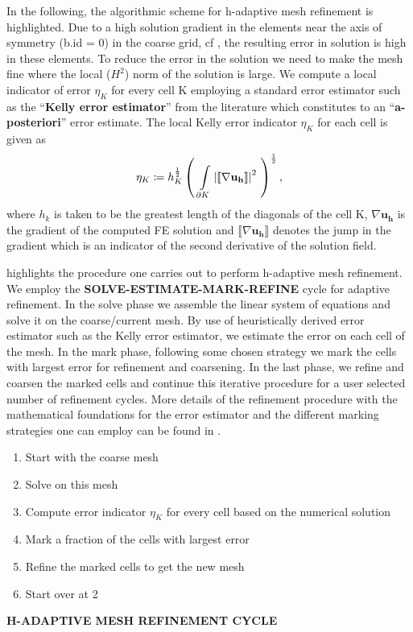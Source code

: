 In the following, the algorithmic scheme for h-adaptive mesh refinement is highlighted. Due to a high solution gradient in the elements near the axis of symmetry (b.id = 0) in the coarse grid, cf , the resulting error in solution is high in these elements. To reduce the error in the solution we need to make the mesh fine where the local ($H^2$) norm of the solution is large. We compute a local indicator of error $\eta_K$ for every cell K employing a standard error estimator such as the ``\textbf{Kelly error estimator}'' from the literature \cite{Kelly1983} which constitutes to an ``\textbf{a-posteriori}'' error estimate. The local Kelly error indicator $\eta_K$ for each cell is given as 
\begin{equation}
\eta_K \coloneqq h_K^{\frac{1}{2}} \left( \ \int\limits_{\partial K} \seminorm{{\llbracket\nabla \mathbf{u_h} \rrbracket}}^2 \ \right)^{\frac{1}{2}},
\label{eq:2.27}
\end{equation}
where $h_k$ is taken to be the greatest length of the diagonals of the cell K, $\nabla \mathbf{u_h}$ is the gradient of the computed FE solution and $\llbracket\nabla \mathbf{u_h} \rrbracket$ denotes the jump in the gradient which is an indicator of the second derivative of the solution field. \par 

 highlights the procedure one carries out to perform h-adaptive mesh refinement. We employ the \textbf{SOLVE-ESTIMATE-MARK-REFINE} cycle for adaptive refinement. In the solve phase we assemble the linear system of equations and solve it on the coarse/current mesh. By use of heuristically derived error estimator such as the Kelly error estimator, we estimate the error on each cell of the mesh. In the mark phase, following some chosen strategy we mark the cells with largest error for refinement and coarsening. In the last phase, we refine and coarsen the marked cells and continue this iterative procedure for a user selected number of refinement cycles. More details of the refinement procedure with the mathematical foundations for the error estimator and the different marking strategies one can employ can be found in \cite[Chapter 4]{Gholap_project}. \par 

\begin{algorithm}[h!]
\begin{enumerate}
\item Start with the coarse mesh
\item Solve on this mesh
\item Compute error indicator $\eta_K$ for every cell based on the numerical solution
\item Mark a fraction of the cells with largest error
\item Refine the marked cells to get the new mesh
\item Start over at 2
\end{enumerate}
\caption{\textbf{H-ADAPTIVE MESH REFINEMENT CYCLE}}
\label{alg:2.2} 
\end{algorithm}

